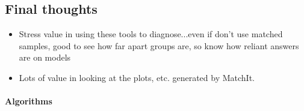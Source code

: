 \documentclass[11pt,titlepage]{article}
\begin{document}
\subsection{Final thoughts}
\begin{itemize}
\item Stress value in using these tools to diagnose...even if don't
  use matched samples, good to see how far apart groups are, so know
  how reliant answers are on models
\item Lots of value in looking at the plots, etc. generated by
  MatchIt.
\end{itemize}

\paragraph{Algorithms}
\end{document}
